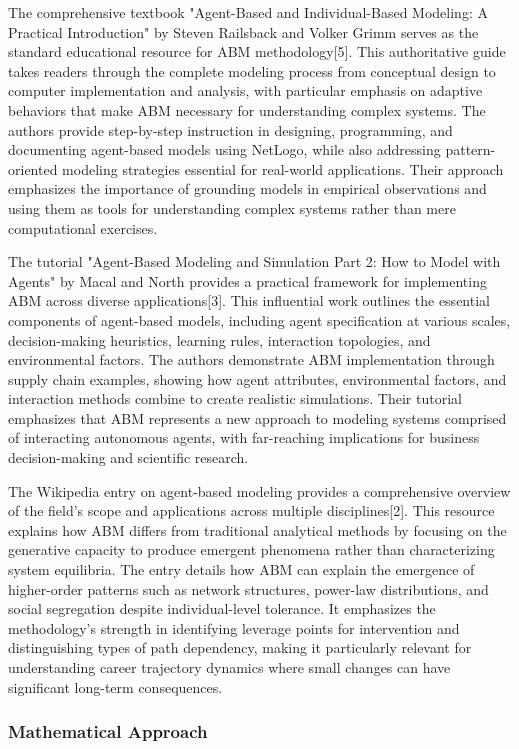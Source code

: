 \documentclass[main.tex]{subfiles}
\begin{document}
The comprehensive textbook "Agent-Based and Individual-Based Modeling: A Practical Introduction" by Steven Railsback and Volker Grimm serves as the standard educational resource for ABM methodology[5]. This authoritative guide takes readers through the complete modeling process from conceptual design to computer implementation and analysis, with particular emphasis on adaptive behaviors that make ABM necessary for understanding complex systems. The authors provide step-by-step instruction in designing, programming, and documenting agent-based models using NetLogo, while also addressing pattern-oriented modeling strategies essential for real-world applications. Their approach emphasizes the importance of grounding models in empirical observations and using them as tools for understanding complex systems rather than mere computational exercises.

The tutorial "Agent-Based Modeling and Simulation Part 2: How to Model with Agents" by Macal and North provides a practical framework for implementing ABM across diverse applications[3]. This influential work outlines the essential components of agent-based models, including agent specification at various scales, decision-making heuristics, learning rules, interaction topologies, and environmental factors. The authors demonstrate ABM implementation through supply chain examples, showing how agent attributes, environmental factors, and interaction methods combine to create realistic simulations. Their tutorial emphasizes that ABM represents a new approach to modeling systems comprised of interacting autonomous agents, with far-reaching implications for business decision-making and scientific research.

The Wikipedia entry on agent-based modeling provides a comprehensive overview of the field's scope and applications across multiple disciplines[2]. This resource explains how ABM differs from traditional analytical methods by focusing on the generative capacity to produce emergent phenomena rather than characterizing system equilibria. The entry details how ABM can explain the emergence of higher-order patterns such as network structures, power-law distributions, and social segregation despite individual-level tolerance. It emphasizes the methodology's strength in identifying leverage points for intervention and distinguishing types of path dependency, making it particularly relevant for understanding career trajectory dynamics where small changes can have significant long-term consequences.

\subsubsection{Mathematical Approach}
\end{document}

